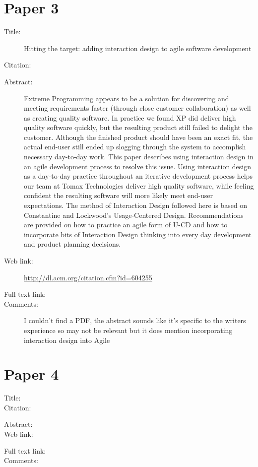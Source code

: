 \documentclass{scrartcl}
\begin{document}
\section*{Paper 3}
\begin{description}
	\item[Title:] Hitting the target: adding interaction design to agile software development
	\item[Citation:] \cite{Patton}
	\item[Abstract:] Extreme Programming appears to be a solution for discovering and meeting requirements faster (through close customer collaboration) as well as creating quality software. In practice we found XP did deliver high quality software quickly, but the resulting product still failed to delight the customer. Although the finished product should have been an exact fit, the actual end-user still ended up slogging through the system to accomplish necessary day-to-day work. This paper describes using interaction design in an agile development process to resolve this issue. Using interaction design as a day-to-day practice throughout an iterative development process helps our team at Tomax Technologies deliver high quality software, while feeling confident the resulting software will more likely meet end-user expectations. The method of Interaction Design followed here is based on Constantine and Lockwood's Usage-Centered Design. Recommendations are provided on how to practice an agile form of U-CD and how to incorporate bits of Interaction Design thinking into every day development and product planning decisions.
	\item[Web link:] \url{http://dl.acm.org/citation.cfm?id=604255}
	\item[Full text link:]
	\item[Comments:]  I couldn't find a PDF, the abstract sounds like it's specific to the writers experience so may not be relevant but it does mention incorporating interaction design into Agile 
\end{description}


\section*{Paper 4}
\begin{description}
	\item[Title:] 
	\item[Citation:] \cite{}
	\item[Abstract:] 
	\item[Web link:] \url{}
	\item[Full text link:]
	\item[Comments:]  
\end{description}
\end{document}
